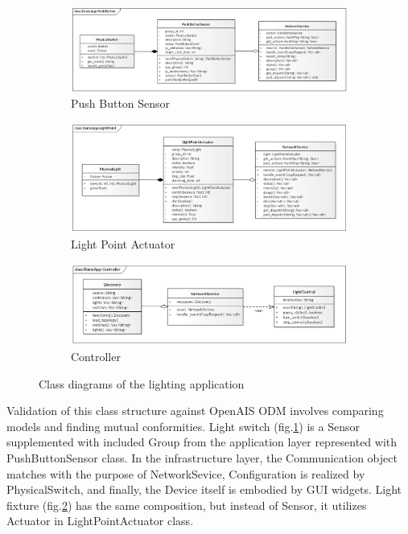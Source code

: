 \documentclass[11pt, english, a4paper, twoside]{article}
\begin{document}
\begin{figure}[ht]
	\centering
	\begin{subfigure}[b]{0.8\textwidth}
		\includegraphics[width=\textwidth]{DemoApp-PushButton.png}
		\caption{Push Button Sensor}
		\label{fig:demo-switch}
	\end{subfigure}
    \hfill
    \begin{subfigure}[b]{0.8\textwidth}
		\includegraphics[width=\textwidth]{DemoApp-LightPoint.png}
		\caption{Light Point Actuator}
		\label{fig:demo-light}
	\end{subfigure}
	\hfill
    \begin{subfigure}[b]{0.8\textwidth}
		\includegraphics[width=\textwidth]{DemoApp-Controller.png}
		\caption{Controller}
		\label{fig:demo-control}
	\end{subfigure}
	\caption{Class diagrams of the lighting application}
\end{figure}


Validation of this class structure against OpenAIS ODM involves comparing models and finding mutual conformities. Light switch (fig.\ref{fig:demo-switch}) is a Sensor supplemented with included Group from the application layer represented with PushButtonSensor class. In the infrastructure layer, the Communication object matches with the purpose of NetworkSevice, Configuration is realized by PhysicalSwitch, and finally, the Device itself is embodied by GUI widgets. Light fixture (fig.\ref{fig:demo-light}) has the same composition, but instead of Sensor, it utilizes Actuator in LightPointActuator class. 
\end{document}
